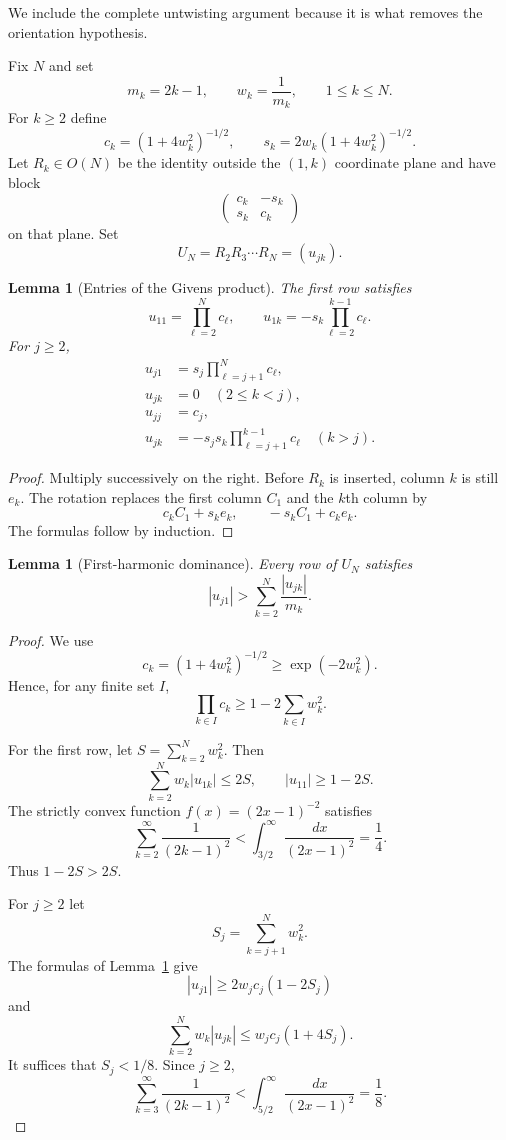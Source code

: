 \documentclass[11pt]{article}
\newtheorem{lemma}[theorem]{Lemma}
\begin{document}
We include the complete untwisting argument because it is what removes the
orientation hypothesis.

Fix $N$ and set
\[
        m_k=2k-1,\qquad w_k=\frac1{m_k},
        \qquad1\le k\le N.
\]
For $k\ge2$ define
\[
 c_k=(1+4w_k^2)^{-1/2},
 \qquad
 s_k=2w_k(1+4w_k^2)^{-1/2}.
\]
Let $R_k\in O(N)$ be the identity outside the $(1,k)$ coordinate plane and
have block
\[
        \begin{pmatrix}c_k&-s_k\\ s_k&c_k\end{pmatrix}
\]
on that plane.  Set
\[
        U_N=R_2R_3\cdots R_N=(u_{jk}).
\]

\begin{lemma}[Entries of the Givens product]\label{lem:Givens-entries}
The first row satisfies
\[
 u_{11}=\prod_{\ell=2}^Nc_\ell,\qquad
 u_{1k}=-s_k\prod_{\ell=2}^{k-1}c_\ell.
\]
For $j\ge2$,
\[
\begin{aligned}
 u_{j1}&=s_j\prod_{\ell=j+1}^Nc_\ell,\\
 u_{jk}&=0\quad(2\le k<j),\\
 u_{jj}&=c_j,\\
 u_{jk}&=-s_js_k\prod_{\ell=j+1}^{k-1}c_\ell
 \quad(k>j).
\end{aligned}
\]
\end{lemma}

\begin{proof}
Multiply successively on the right.  Before $R_k$ is inserted, column $k$
is still $e_k$.  The rotation replaces the first column $C_1$ and the
$k$th column by
\[
        c_kC_1+s_ke_k,\qquad -s_kC_1+c_ke_k.
\]
The formulas follow by induction.
\end{proof}

\begin{lemma}[First-harmonic dominance]\label{lem:dominance}
Every row of $U_N$ satisfies
\begin{equation}\label{eq:row-dominance}
        \boxed{
        |u_{j1}|>
        \sum_{k=2}^N\frac{|u_{jk}|}{m_k}.}
\end{equation}
\end{lemma}

\begin{proof}
We use
\[
 c_k=(1+4w_k^2)^{-1/2}
 \ge \exp(-2w_k^2).
\]
Hence, for any finite set $I$,
\[
        \prod_{k\in I}c_k
        \ge1-2\sum_{k\in I}w_k^2.
\]

For the first row, let $S=\sum_{k=2}^Nw_k^2$.  Then
\[
 \sum_{k=2}^Nw_k|u_{1k}|
 \le2S,
 \qquad
 |u_{11}|\ge1-2S.
\]
The strictly convex function $f(x)=(2x-1)^{-2}$ satisfies
\[
 \sum_{k=2}^{\infty}\frac1{(2k-1)^2}
 <
 \int_{3/2}^{\infty}\frac{dx}{(2x-1)^2}
 =\frac14.
\]
Thus $1-2S>2S$.

For $j\ge2$ let
\[
        S_j=\sum_{k=j+1}^Nw_k^2.
\]
The formulas of Lemma~\ref{lem:Givens-entries} give
\[
 |u_{j1}|\ge2w_jc_j(1-2S_j)
\]
and
\[
 \sum_{k=2}^Nw_k|u_{jk}|
 \le w_jc_j(1+4S_j).
\]
It suffices that $S_j<1/8$.  Since $j\ge2$,
\[
 \sum_{k=3}^{\infty}\frac1{(2k-1)^2}
 <
 \int_{5/2}^{\infty}\frac{dx}{(2x-1)^2}
 =\frac18.
\]
\end{proof}
\end{document}
